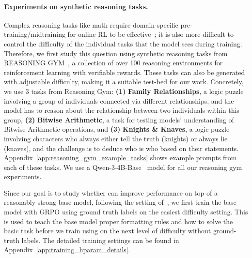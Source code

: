 \paragraph{Experiments on synthetic reasoning tasks.} 
Complex reasoning tasks like math require domain-specific pre-training/midtraining for online RL to be effective~\citep{wu2025miragemethodmodeltaskalignment,gandhi2025cognitivebehaviorsenableselfimproving}; it is also more difficult to control the difficulty of the individual tasks that the model sees during training. Therefore, we first study this question using synthetic reasoning tasks from REASONING GYM~\citep{stojanovski2025reasoninggymreasoningenvironments}, a collection of over 100 reasoning environments for reinforcement learning with verifiable rewards. These tasks can also be generated with adjustable difficulty, making it a suitable test-bed for our work. Concretely, we use 3 tasks from Reasoning Gym: \textbf{(1)} \textbf{Family Relationships}, a logic puzzle involving a group of individuals connected via different relationships, and the model has to reason about the relationship between two individuals within this group, \textbf{(2)} \textbf{Bitwise Arithmetic}, a task for testing models' understanding of Bitwise Arithmetic operations, and \textbf{(3)} \textbf{Knights \& Knaves}, a logic puzzle involving characters who always either tell the truth (knights) or always lie (knaves), and the challenge is to deduce who is who based on their statements. Appendix~\ref{app:reasoning_gym_example_tasks} shows example prompts from each of these tasks. We use a Qwen-3-4B-Base~\citep{yang2025qwen3technicalreport} model for all our reasoning gym experiments.

Since our goal is to study whether \algo{} can improve performance on top of a reasonably strong base model, following the setting of~\citet{lee2025selfimprovingtransformersovercomeeasytohard}, we first train the base model with GRPO using ground truth labels on the easiest difficulty setting. This is used to teach the base model proper formatting rules and how to solve the basic task before we train using \algo{} on the next level of difficulty without ground-truth labels. The detailed training settings can be found in Appendix~\ref{app:training_hparam_details}.

